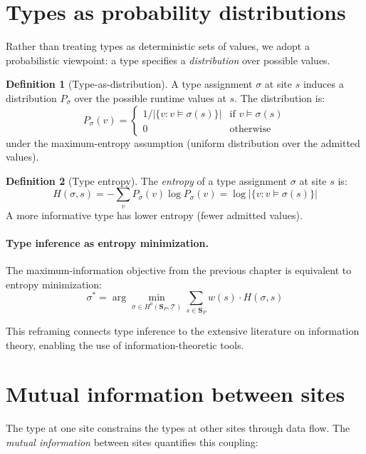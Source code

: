 \documentclass[11pt]{report}
\theoremstyle{definition}
\newtheorem{definition}{Definition}[section]
\theoremstyle{plain}
\begin{document}
\section{Types as probability distributions}

Rather than treating types as deterministic sets of values, we adopt a
probabilistic viewpoint: a type specifies a \emph{distribution} over
possible values.

\begin{definition}[Type-as-distribution]
A type assignment $\sigma$ at site $s$ induces a distribution $P_\sigma$ over
the possible runtime values at $s$. The distribution is:
\[
  P_\sigma(v) = \begin{cases}
    1/|\{v : v \models \sigma(s)\}| & \text{if } v \models \sigma(s) \\
    0 & \text{otherwise}
  \end{cases}
\]
under the maximum-entropy assumption (uniform distribution over the admitted
values).
\end{definition}

\begin{definition}[Type entropy]
The \emph{entropy} of a type assignment $\sigma$ at site $s$ is:
\[
  H(\sigma, s) = -\sum_{v} P_\sigma(v) \log P_\sigma(v)
    = \log |\{v : v \models \sigma(s)\}|
\]
A more informative type has lower entropy (fewer admitted values).
\end{definition}

\paragraph{Type inference as entropy minimization.}
The maximum-information objective from the previous chapter is equivalent to
entropy minimization:
\[
  \sigma^* = \arg\min_{\sigma \in H^0(\mathbf{S}_P, \mathcal{T})}
    \sum_{s \in \mathbf{S}_P} w(s) \cdot H(\sigma, s)
\]

This reframing connects type inference to the extensive literature on
information theory, enabling the use of information-theoretic tools.

\section{Mutual information between sites}

The type at one site constrains the types at other sites through data flow.
The \emph{mutual information} between sites quantifies this coupling:
\end{document}
